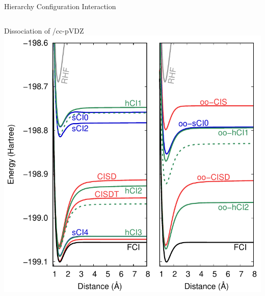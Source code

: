 \documentclass[aspectratio=169,9pt]{beamer}
\begin{document}
\begin{frame}{Hierarchy Configuration Interaction}
\begin{columns}
        \begin{column}{0.40\textwidth}
        \begin{block}{Dissociation of /cc-pVDZ}
        \includegraphics[width=1.00\textwidth]{fig/F2_pes.pdf}
        \end{block}
        \end{column}

        \end{columns}

\end{frame}
\end{document}
